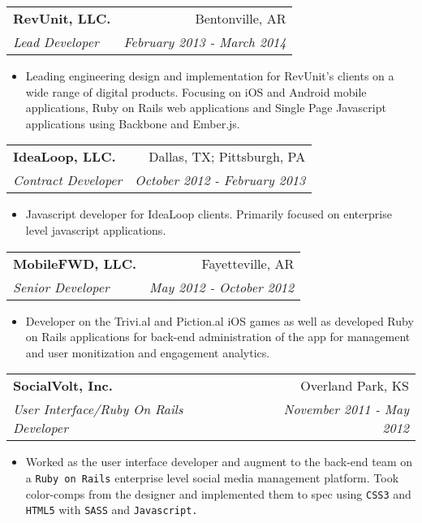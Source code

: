 \documentclass[letterpaper,13pt]{article}
\makeatletter
\newcommand{\resitem}[1]{\item #1 \vspace{-2pt}}
\newcommand{\ressubheading}[4]{

\begin{tabular*}{6.5in}{l@{\cftdotfill{\cftsecdotsep}\extracolsep{\fill}}r}

		\textbf{#1} & #2 \\

		\textit{#3} & \textit{#4} \\

\end{tabular*}\vspace{-4pt}}
\makeatother
\begin{document}
\item

	\ressubheading{RevUnit, LLC.}{Bentonville, AR}{Lead Developer}{February 2013 - March 2014}

	\begin{itemize}

		\resitem{Leading engineering design and implementation for RevUnit's clients on a wide range of digital products. Focusing on iOS and Android mobile applications, Ruby on Rails web applications and Single Page Javascript applications using Backbone and Ember.js.}

	\end{itemize}

\item

	\ressubheading{IdeaLoop, LLC.}{Dallas, TX; Pittsburgh, PA}{Contract Developer}{October 2012 - February 2013}

	\begin{itemize}

		\resitem{Javascript developer for IdeaLoop clients. Primarily focused on enterprise level javascript applications.}

	\end{itemize}

\item

	\ressubheading{MobileFWD, LLC.}{Fayetteville, AR}{Senior Developer}{May 2012 - October 2012}

	\begin{itemize}

		\resitem{Developer on the Trivi.al and Piction.al iOS games as well as developed Ruby on Rails applications for back-end administration of the app for management and user monitization and engagement analytics.}

	\end{itemize}
	
\item

	\ressubheading{SocialVolt, Inc.}{Overland Park, KS}{User Interface/Ruby On Rails Developer}{November 2011 - May 2012}

	\begin{itemize}

		\resitem{Worked as the user interface developer and augment to the back-end team on a \texttt{Ruby on Rails} enterprise level social media management platform. Took color-comps from the designer and implemented them to spec using \texttt{CSS3} and \texttt{HTML5} with \texttt{SASS} and \texttt{Javascript.}}

	\end{itemize}
	
\end{document}
